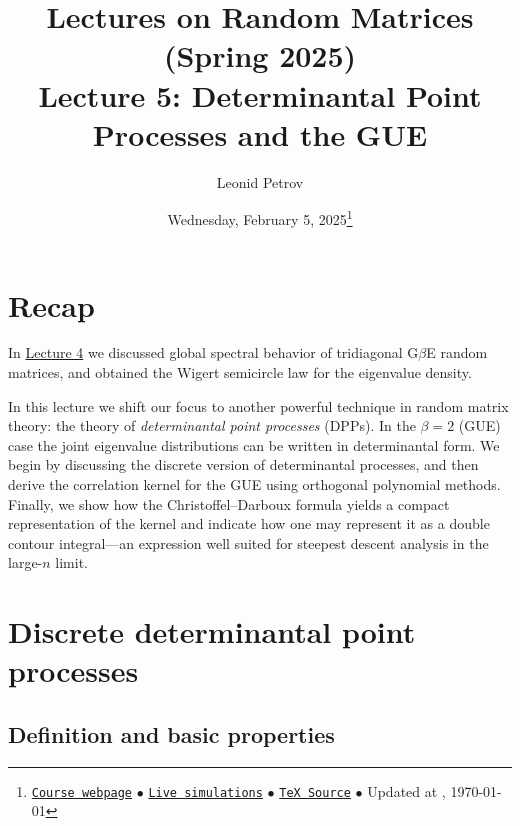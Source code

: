 \documentclass[letterpaper,11pt,oneside,reqno]{article}
\numberwithin{equation}{section}
\theoremstyle{definition}
\begin{document}
\title{Lectures on Random Matrices
(Spring 2025)
\\Lecture 5: Determinantal Point Processes and the GUE}


\date{Wednesday, February 5, 2025\footnote{\href{https://lpetrov.cc/rmt25/}{\texttt{Course webpage}}
$\bullet$ \href{https://lpetrov.cc/simulations/model/random-matrices/}{\texttt{Live simulations}}
$\bullet$ \href{https://lpetrov.cc/rmt25/rmt25-notes/rmt2025-l05.tex}{\texttt{TeX Source}}
$\bullet$
Updated at \currenttime, \today}}



\author{Leonid Petrov}


\maketitle
\tableofcontents




\section{Recap}
In
\href{https://lpetrov.cc/rmt25/rmt25-notes/rmt2025-l04.pdf}{Lecture 4}
we discussed global spectral behavior of
tridiagonal G$\beta$E random matrices,
and obtained the Wigert semicircle law for the eigenvalue density.

In this lecture we shift our focus to another powerful
technique in random matrix theory: the theory of
\emph{determinantal point processes} (DPPs). In the
$\beta=2$ (GUE) case the joint eigenvalue distributions can
be written in determinantal form. We begin by discussing the
discrete version of determinantal processes, and then derive
the correlation kernel for the GUE using orthogonal
polynomial methods. Finally, we show how the
Christoffel--Darboux formula yields a compact representation
of the kernel and indicate how one may represent it as a
double contour integral—an expression well suited for
steepest descent analysis in the large-$n$ limit.

\section{Discrete determinantal point processes}
\label{sec:dpp-discrete}
\subsection{Definition and basic properties}
\end{document}
